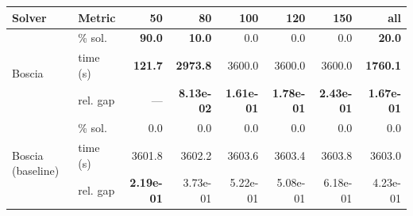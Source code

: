 \begin{tabular}{llrrrrrr}
\toprule
 Solver & Metric & 50 & 80 & 100 & 120 & 150 & all \\
\midrule
\multirow{3}{*}{Boscia} & \% sol. & \textbf{90.0} & \textbf{10.0} & 0.0 & 0.0 & 0.0 & \textbf{20.0} \\
  & time (s) & \textbf{121.7} & \textbf{2973.8} & 3600.0 & 3600.0 & 3600.0 & \textbf{1760.1} \\
  & rel. gap & --- & \textbf{8.13e-02} & \textbf{1.61e-01} & \textbf{1.78e-01} & \textbf{2.43e-01} & \textbf{1.67e-01} \\
\midrule
\multirow{3}{*}{Boscia (baseline)} & \% sol. & 0.0 & 0.0 & 0.0 & 0.0 & 0.0 & 0.0 \\
  & time (s) & 3601.8 & 3602.2 & 3603.6 & 3603.4 & 3603.8 & 3603.0 \\
  & rel. gap & \textbf{2.19e-01} & 3.73e-01 & 5.22e-01 & 5.08e-01 & 6.18e-01 & 4.23e-01 \\
\bottomrule
\end{tabular}
